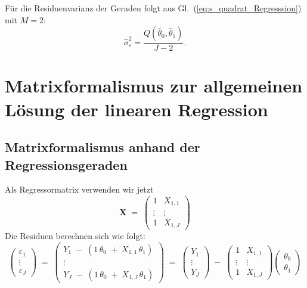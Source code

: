 Für die Residuenvarianz der Geraden folgt aus Gl.~(\ref{eq:s_quadrat_Regresssion}) mit $M=2$:
\begin{equation}
\hat\sigma^2_\varepsilon = \frac{Q(\hat\theta_0,\hat\theta_1)}{J-2} .
\end{equation}

\section{Matrixformalismus zur allgemeinen Lösung der linearen Regression}
\subsection{Matrixformalismus anhand der Regressionsgeraden}
Als Regressormatrix verwenden wir jetzt
\begin{equation}
\mathbf{X} \; = \;
\left(
\begin{array}{cc}
1 &  X_{1,1} \\
\vdots & \vdots\\
1 & X_{1,J}
\end{array}
\right)
\end{equation}
Die Residuen berechnen sich wie folgt:
\begin{equation}
\left(
\begin{array}{c}
\varepsilon_1\\
\vdots \\
\varepsilon_J
\end{array}
\right)  \; = \;
\left(
\begin{array}{c}
Y_{1} \; - \; (1 \, \theta_0 \; + \;  X_{1,1} \, \theta_1)\\
\vdots \\
Y_{J} \; - \; (1 \, \theta_0 \; + \;  X_{1,J} \, \theta_1)
\end{array}
\right) \; = \;
\left(
\begin{array}{c}
Y_{1}\\
\vdots \\
Y_{J}
\end{array}
\right)
\; - \;
\left(
\begin{array}{cc}
1 &  X_{1,1} \\
\vdots & \vdots\\
1 & X_{1,J}
\end{array}
\right)
\left(
\begin{array}{c}
\theta_0\\
\theta_1
\end{array}
\right)
\label{linearRegressionGeradeTheta}
\end{equation}
